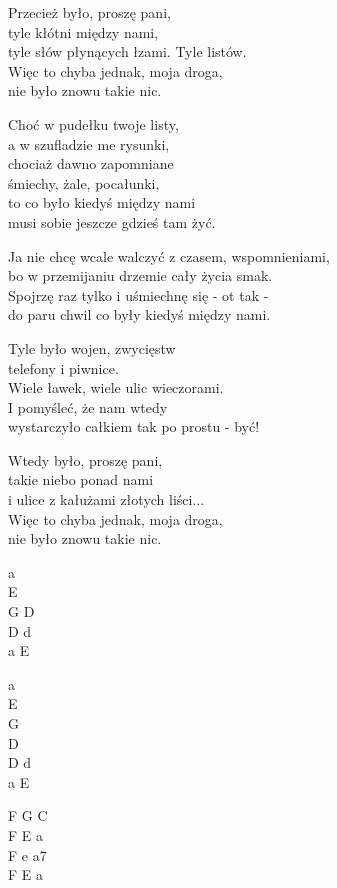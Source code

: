 \begin{text}
    Przecież było, proszę pani,\\
    tyle kłótni między nami,\\
    tyle słów płynących łzami. Tyle listów.\\
    Więc to chyba jednak, moja droga,\\
    nie było znowu takie nic.

    Choć w pudełku twoje listy,\\
    a w szufladzie me rysunki,\\
    chociaż dawno zapomniane\\
    śmiechy, żale, pocałunki,\\
    to co było kiedyś między nami\\
    musi sobie jeszcze gdzieś tam żyć.

    Ja nie chcę wcale walczyć z czasem, wspomnieniami,\\
    bo w przemijaniu drzemie cały życia smak.\\
    Spojrzę raz tylko i uśmiechnę się - ot tak -\\
    do paru chwil co były kiedyś między nami.

    Tyle było wojen, zwycięstw\\
    telefony i piwnice.\\
    Wiele ławek, wiele ulic wieczorami.\\
    I pomyśleć, że nam wtedy\\
    wystarczyło całkiem tak po prostu - być!

    Wtedy było, proszę pani,\\
    takie niebo ponad nami\\
    i ulice z kałużami złotych liści...\\
    Więc to chyba jednak, moja droga,\\
    nie było znowu takie nic.
\end{text}
\begin{chord}
    a\\
    E\\
    G D\\
    D d\\
    a E

    a\\
    E\\
    G\\
    D\\
    D d\\
    a E

    F G C\\
    F E a\\
    F e a7\\
    F E a
\end{chord}